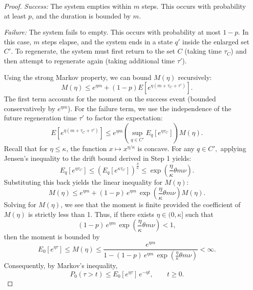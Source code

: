 \documentclass[11pt]{article}
\begin{document}
\begin{proof}
\textit{Success:} The system empties within $m$ steps. This occurs with probability at least $p$, and the duration is bounded by $m$. 

\textit{Failure:} The system fails to empty. This occurs with probability at most $1-p$. In this case, $m$ steps elapse, and the system ends in a state $q'$ inside the enlarged set $C'$. To regenerate, the system must first return to the set $C$ (taking time $\tau_C$) and then attempt to regenerate again (taking additional time $\tau'$).

Using the strong Markov property, we can bound $M(\eta)$ recursively:
\begin{equation}
    M(\eta) \le e^{\eta m} + (1-p) E\left[e^{\eta(m + \tau_C + \tau')}\right].
\end{equation}
The first term accounts for the moment on the success event (bounded conservatively by $e^{\eta m}$). For the failure term, we use the independence of the future regeneration time $\tau'$ to factor the expectation:
\begin{equation}
    E\left[e^{\eta(m + \tau_C + \tau')}\right] \leq e^{\eta m} \left(\sup_{q\in C'}E_q\left[e^{\eta \tau_C}\right] \right)M(\eta).
\end{equation}
Recall that for $\eta \le \kappa$, the function $x \mapsto x^{\eta/\kappa}$ is concave. For any $q\in C',$ applying Jensen's inequality to the drift bound derived in Step 1 yields:
\begin{equation}
    E_q\left[e^{\eta \tau_C}\right] \le \left( E_q\left[e^{\kappa \tau_C}\right] \right)^{\frac{\eta}{\kappa}} \le \exp\!\left(\frac{\eta}{\kappa}\theta m \nu\right).
\end{equation}
Substituting this back yields the linear inequality for $M(\eta)$:
\begin{equation}
    M(\eta) \le e^{\eta m} + (1-p)\,e^{\eta m}\,\exp\!\left(\frac{\eta}{\kappa}\theta m\nu\right) M(\eta).
\end{equation}
Solving for $M(\eta)$, we see that the moment is finite provided the coefficient of $M(\eta)$ is strictly less than 1. Thus, if there exists $\eta \in (0, \kappa]$ such that
\begin{equation}
    \label{eq:eta-condition}
    (1-p)\,e^{\eta m}\,\exp\!\left(\frac{\eta}{\kappa}\theta m\nu\right) < 1,
\end{equation}
then the moment is bounded by
\begin{equation}
    \label{eq:exp-moment-tau}
    E_0\!\left[e^{\eta \tau}\right] \le M(\eta)
    \le
    \frac{e^{\eta m}}{1-(1-p)\,e^{\eta m}\,\exp\!\left(\frac{\eta}{\kappa}\theta m\nu\right)}
    <\infty.
\end{equation}
Consequently, by Markov's inequality,
\begin{equation}
\label{eq:tail-tau}
P_0(\tau>t)\le E_0[e^{\eta \tau}]\,e^{-\eta t},
\qquad t\ge 0.
\end{equation}
\end{proof}
\end{document}
